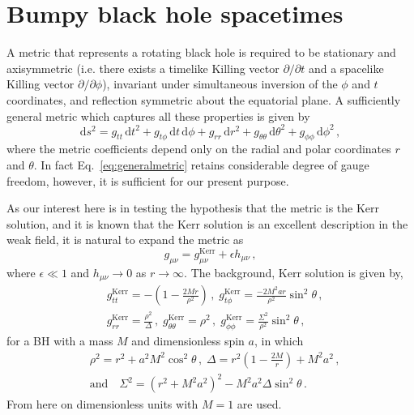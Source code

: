 \section{Bumpy black hole spacetimes}\label{sec:spacetimes}
A metric that represents a rotating black hole is required to be stationary and axisymmetric (i.e. there exists a timelike Killing vector $\partial/\partial t$ and a spacelike Killing vector $\partial/\partial\phi$), invariant under simultaneous inversion of the $\phi$ and $t$ coordinates, and reflection symmetric about the equatorial plane. A sufficiently general metric which captures all these properties is given by \citep{Chandrasekhar:579245}
\begin{equation}\label{eq:generalmetric} \textrm{d}s^{2}=g_{tt}\,\textrm{d}t^{2} + g_{t\phi}\,\textrm{d}t\,\textrm{d}\phi + g_{rr}\,\textrm{d}r^{2} + g_{\theta\theta}\,\textrm{d}\theta^{2} + g_{\phi\phi}\,\textrm{d}\phi^{2}\, , \end{equation}
where the metric coefficients depend only on the radial and polar coordinates $r$ and $\theta$. In fact Eq.\ \ref{eq:generalmetric} retains considerable degree of gauge freedom, however, it is sufficient for our present purpose. 

As our interest here is in testing the hypothesis that the metric is the Kerr solution, and it is known that the Kerr solution is an excellent description in the weak field, it is natural to expand the metric as
\begin{equation} g_{\mu \nu}=g^{\textrm{Kerr}}_{\mu \nu}+\epsilon h_{\mu \nu} \, ,\end{equation}
where $\epsilon \ll 1$ and $h_{\mu\nu}\rightarrow 0$ as $r\rightarrow\infty$. The background,  Kerr solution is given by,
\begin{eqnarray} &g^{\textrm{Kerr}}_{tt}=-\left( 1-\frac{2Mr}{\rho^{2}} \right)\, , \;  g^{\textrm{Kerr}}_{t\phi}=\frac{-2M^{2}ar}{\rho^{2}}\sin ^{2} \theta \, ,\nonumber \\
&g^{\textrm{Kerr}}_{rr}=\frac{\rho^{2}}{\Delta}\, , \; g^{\textrm{Kerr}}_{\theta \theta}=\rho^{2} \, , \; g^{\textrm{Kerr}}_{\phi \phi}=\frac{\Sigma^{2}}{\rho^{2}}\sin ^{2} \theta \, , \end{eqnarray}
for a BH with a mass $M$ and dimensionless spin $a$, in which
\begin{eqnarray} &\rho^{2}=r^{2}+a^{2}M^{2}\cos ^{2} \theta \, , \; \Delta = r^{2}\left( 1-\frac{2M}{r} \right) +M^{2}a^{2} \, ,\\
&\textrm{and}\quad \Sigma^{2} = \left( r^{2}+M^{2}a^{2} \right)^{2} - M^{2}a^{2}\Delta \sin ^{2} \theta \, \nonumber .\end{eqnarray}
From here on dimensionless units with $M=1$ are used.

